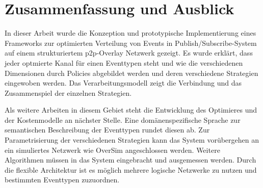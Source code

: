 \chapter{Zusammenfassung und Ausblick} 
\label{chap:zus}
In dieser Arbeit wurde die Konzeption und prototypische Implementierung eines Frameworks zur optimierten Verteilung von Events in Publish/Subscribe-System auf einem strukturiertem p2p-Overlay Netzwerk gezeigt. Es wurde erklärt, dass jeder optmierte Kanal für einen Eventtypen steht und wie die verschiedenen Dimensionen durch Policies abgebildet werden und deren verschiedene Strategien eingewoben werden. Das Verarbeitungsmodell zeigt die Verbindung und das Zusammenspiel der einzelnen Strategien.

Als weitere Arbeiten in diesem Gebiet steht die Entwicklung des Optimieres und der Kostenmodelle an nächster Stelle. Eine domänenspezifische Sprache zur semantischen Beschreibung der Eventtypen rundet diesen ab. Zur Parametrisierung der verschiedenen Strategien kann das System vorübergehen an ein simuliertes Netzwerk wie OverSim \cite{Baumgart2007OverSim} angeschlossen werden. Weitere Algorithmen müssen in das System eingebracht und ausgemessen werden. Durch die flexible Architektur ist es möglich mehrere logische Netzwerke zu nutzen und bestimmten Eventtypen zuzuordnen.


